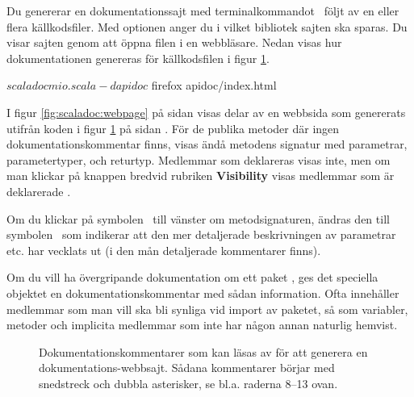 Du genererar en dokumentationssajt med terminalkommandot \scaladoc~följt av en eller flera källkodsfiler. Med optionen  anger du i vilket bibliotek sajten ska sparas. Du visar sajten genom att öppna filen  i en webbläsare. Nedan visas hur dokumentationen genereras för källkodsfilen i figur \ref{fig:scaladoc:mio}.
\begin{REPLnonum}
$ scaladoc mio.scala -d apidoc
$ firefox apidoc/index.html
\end{REPLnonum}

I figur \ref{fig:scaladoc:webpage} på sidan \pageref{fig:scaladoc:webpage} visas delar av en webbsida som genererats utifrån koden i figur \ref{fig:scaladoc:mio} på sidan \pageref{fig:scaladoc:mio}. För de publika metoder där ingen dokumentationskommentar finns, visas ändå metodens signatur med parametrar, parametertyper, och returtyp. Medlemmar som deklareras  visas inte, men om man klickar på knappen  bredvid rubriken \textbf{Visibility} visas medlemmar som är deklarerade .

Om du klickar på symbolen \Forward~till vänster om metodsignaturen, ändras den till symbolen \MoveDown  ~som indikerar att den mer detaljerade beskrivningen av parametrar etc. har vecklats ut (i den mån detaljerade kommentarer finns). 

Om du vill ha övergripande dokumentation om ett paket , ges det speciella objektet  en dokumentationskommentar med sådan information. Ofta innehåller  medlemmar som man vill ska bli synliga vid import av paketet, så som variabler, metoder och implicita medlemmar som inte har någon annan naturlig hemvist.

\begin{figure}[B]
    \caption{Dokumentationskommentarer som kan läsas av \scaladoc för att generera en dokumentations-webbsajt. Sådana kommentarer börjar  med snedstreck och dubbla asterisker, se bl.a. raderna 8--13 ovan.}
    \label{fig:scaladoc:mio}
\end{figure}

